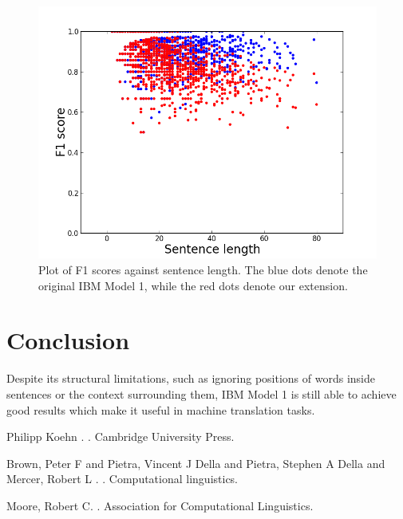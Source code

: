 \documentclass[11pt]{article}
\begin{document}
\begin{figure}[h]
  \centering
  \centerline{\includegraphics[keepaspectratio=true, scale = 0.35]{graph.png}}
\caption{Plot of F1 scores against sentence length. The blue dots denote the original IBM Model 1, while the red dots denote our extension.}
  \label{fig:features}
\end{figure}

\section{Conclusion}
\label{Concl}
Despite its structural limitations, such as ignoring positions of words inside sentences or the context surrounding them,
IBM Model 1 is still able to achieve good results which make it useful in machine translation tasks.



\begin{thebibliography}{}

Philipp Koehn
.
.
\newblock Cambridge University Press.

Brown, Peter F and Pietra, Vincent J Della and Pietra, Stephen A Della and Mercer, Robert L
.
.
\newblock Computational linguistics.%

Moore, Robert C.
.
\newblock Association for Computational Linguistics.

\end{thebibliography}
\end{document}

